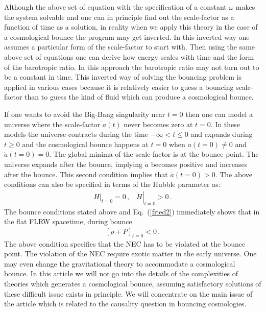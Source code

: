 \documentclass[24pt]{article}
\begin{document}
Although the above set of equation with the specification of a
constant $\omega$ makes the system solvable and one can in principle
find out the scale-factor as a function of time as a solution, in
reality when we apply this theory in the case of a cosmological bounce
the program may get inverted. In this inverted way one assumes a
particular form of the scale-factor to start with. Then using the same
above set of equations one can derive how energy scales with time and
the form of the barotropic ratio. In this approach the barotropic
ratio may not turn out to be a constant in time.  This inverted way of
solving the bouncing problem is applied in various cases because it is
relatively easier to guess a bouncing scale-factor than to guess the
kind of fluid which can produce a cosmological bounce.

If one wants to avoid the Big-Bang singularity near $t=0$ then one can
model a universe where the scale-factor $a(t)$ never becomes zero at
$t=0$. In these models the universe contracts during the time $-\infty
< t \le 0$ and expands during $t \ge 0$ and the cosmological bounce
happens at $t=0$ when $a(t=0) \ne 0$ and $\dot{a}(t=0)=0$. The global
minima of the scale-factor is at the bounce point. The universe
expands after the bounce, implying $\dot{a}$ becomes positive and
increases after the bounce. This second condition implies that
$\ddot{a}(t=0)>0$. The above conditions can also be specified in terms
of the Hubble parameter as:
\begin{eqnarray}
\left. H \right|_{t=0}=0\,,\,\,\,\,\,
\left. \dot{H} \right|_{t=0} > 0\,.
\label{bcond}
\end{eqnarray}
The bounce conditions stated above and Eq.~(\ref{fried2}) immediately
shows that in the flat FLRW spacetime, during bounce
\begin{eqnarray}
\left[\rho + P \right]_{t=0} < 0\,.
\label{nec}
\end{eqnarray}
The above condition specifies that the NEC has to be violated at the
bounce point. The violation of the NEC require exotic
matter\cite{Rubakov:2014jja} in the early universe. One may even
change the gravitational theory to accommodate a cosmological
bounce\cite{Paul:2014cxa, Bhattacharya:2015nda}. In this article we
will not go into the details of the complexities of theories which
generates a cosmological bounce, assuming satisfactory solutions of
these difficult issue exists in principle. We will concentrate on the
main issue of the article which is related to the causality question
in bouncing cosmologies.
\end{document}
